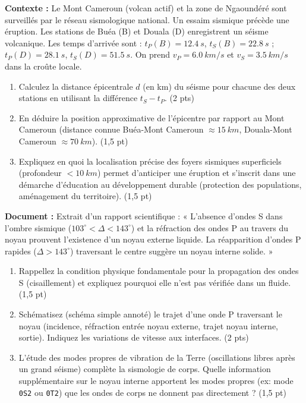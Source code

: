 \documentclass[11pt]{article}
\begin{document}
\begin{exercice}
    \textbf{Contexte :} Le Mont Cameroun (volcan actif) et la zone de Ngaoundéré sont surveillés par le réseau sismologique national. Un essaim sismique précède une éruption. Les stations de Buéa (B) et Douala (D) enregistrent un séisme volcanique. Les temps d'arrivée sont : $t_P(B) = \SI{12.4}{s}$, $t_S(B) = \SI{22.8}{s}$ ; $t_P(D) = \SI{28.1}{s}$, $t_S(D) = \SI{51.5}{s}$. On prend $v_P = \SI{6.0}{km/s}$ et $v_S = \SI{3.5}{km/s}$ dans la croûte locale.
    
    \begin{enumerate}
        \item Calculez la distance épicentrale $d$ (en km) du séisme pour chacune des deux stations en utilisant la différence $t_S - t_P$. (2 pts)
        \item En déduire la position approximative de l'épicentre par rapport au Mont Cameroun (distance connue Buéa-Mont Cameroun $\approx \SI{15}{km}$, Douala-Mont Cameroun $\approx \SI{70}{km}$). (1,5 pt)
        \item Expliquez en quoi la localisation précise des foyers sismiques superficiels (profondeur $< \SI{10}{km}$) permet d'anticiper une éruption et s'inscrit dans une démarche d'éducation au développement durable (protection des populations, aménagement du territoire). (1,5 pt)
    \end{enumerate}
\end{exercice}

\begin{exercice}
    \textbf{Document :} Extrait d'un rapport scientifique : « L'absence d'ondes S dans l'ombre sismique ($103^\circ < \Delta < 143^\circ$) et la réfraction des ondes P au travers du noyau prouvent l'existence d'un noyau externe liquide. La réapparition d'ondes P rapides ($\Delta > 143^\circ$) traversant le centre suggère un noyau interne solide. »
    
    \begin{enumerate}
        \item Rappellez la condition physique fondamentale pour la propagation des ondes S (cisaillement) et expliquez pourquoi elle n'est pas vérifiée dans un fluide. (1,5 pt)
        \item Schématisez (schéma simple annoté) le trajet d'une onde P traversant le noyau (incidence, réfraction entrée noyau externe, trajet noyau interne, sortie). Indiquez les variations de vitesse aux interfaces. (2 pts)
        \item L'étude des modes propres de vibration de la Terre (oscillations libres après un grand séisme) complète la sismologie de corps. Quelle information supplémentaire sur le noyau interne apportent les modes propres (ex: mode \texttt{0S2} ou \texttt{0T2}) que les ondes de corps ne donnent pas directement ? (1,5 pt)
    \end{enumerate}
\end{exercice}
\end{document}
